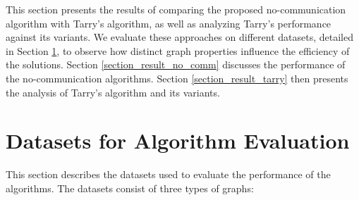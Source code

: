 This section presents the results of comparing the proposed no-communication algorithm with Tarry's algorithm, as well as analyzing Tarry's performance against its variants. We evaluate these approaches on different datasets, detailed in Section \ref{section_datasets}, to observe how distinct graph properties influence the efficiency of the solutions. Section \ref{section_result_no_comm} discusses the performance of the no-communication algorithms. Section \ref{section_result_tarry} then presents the analysis of Tarry's algorithm and its variants.

\section{Datasets for Algorithm Evaluation} 
\label{section_datasets}

This section describes the datasets used to evaluate the performance of the algorithms. The datasets consist of three types of graphs:

